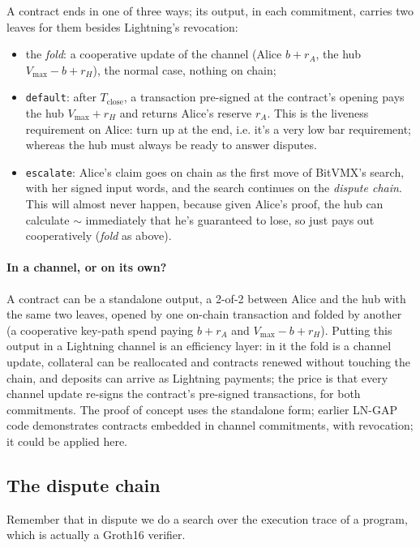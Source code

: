\documentclass[11pt]{article}
\newcommand{\vmax}{V_{\max}}
\newcommand{\Tc}{T_{\mathrm{close}}}
\newcommand{\tx}[1]{\texttt{#1}}
\begin{document}
A contract ends in one of three ways; its output, in each
commitment, carries two leaves for them besides Lightning's revocation:
\begin{itemize}[leftmargin=1.5em]
\item the \emph{fold}: a cooperative update of the channel (Alice
  $b + r_A$, the hub $\vmax - b + r_H$), the normal case, nothing on
  chain;
\item \tx{default}: after $\Tc$, a transaction pre-signed at the
  contract's opening pays the hub $\vmax + r_H$ and returns Alice's
  reserve $r_A$. This is the liveness requirement on Alice: turn up at the end, i.e. it's a very low bar requirement; whereas the hub must always be ready to answer disputes.
\item \tx{escalate}: Alice's claim goes on chain as the first move of
  BitVMX's search, with her signed input words, and the search
  continues on the \emph{dispute chain}. This will almost never happen, because given Alice's proof, the hub can calculate $\sim$ immediately that he's guaranteed to lose, so just pays out cooperatively (\emph{fold} as above).
\end{itemize}

\paragraph{In a channel, or on its own?} A contract can be a standalone
output, a 2-of-2 between Alice and the hub with the same two leaves,
opened by one on-chain transaction and folded by another (a cooperative
key-path spend paying $b + r_A$ and $\vmax - b + r_H$). Putting this output in a Lightning channel is an efficiency layer: in it the fold is a channel update, collateral can be reallocated and contracts renewed without touching the chain, and
deposits can arrive as Lightning payments; the price is that every channel update re-signs the contract's pre-signed transactions, for both commitments. The proof of concept uses the standalone form; earlier LN-GAP code demonstrates contracts embedded in channel commitments, with revocation; it could be applied here.

\subsection{The dispute chain}
\label{sec:ladder}

Remember that in dispute we do a search over the execution trace of a program, which is actually a Groth16 verifier.
\end{document}
